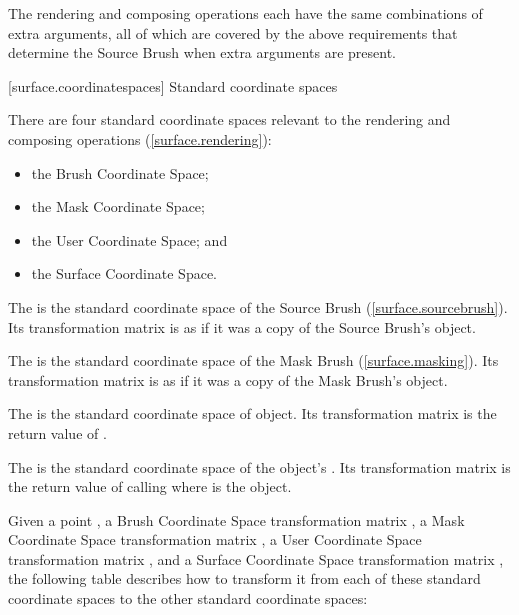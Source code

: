 \pnum
\enternote
The rendering and composing operations each have the same combinations of extra arguments, all of which are covered by the above requirements that determine the Source Brush when extra arguments are present.
\exitnote

%
 [surface.coordinatespaces] {Standard coordinate spaces}

\pnum
There are four standard coordinate spaces relevant to the rendering and composing operations (\ref{surface.rendering}):
\begin{itemize}
\item the Brush Coordinate Space;
\item the Mask Coordinate Space;
\item the User Coordinate Space; and
\item the Surface Coordinate Space.
\end{itemize}

\pnum
The  is the standard coordinate space of the Source Brush (\ref{surface.sourcebrush}). Its transformation matrix is as if it was a copy of the Source Brush's  object.

\pnum
The  is the standard coordinate space of the Mask Brush (\ref{surface.masking}). Its transformation matrix is as if it was a copy of the Mask Brush's  object.

\pnum
The  is the standard coordinate space of  object. Its transformation matrix is the return value of .

\pnum
The  is the standard coordinate space of the  object's \underlyingsurface. Its transformation matrix is the return value of calling  where  is the  object.

\pnum
Given a point , a Brush Coordinate Space transformation matrix , a Mask Coordinate Space transformation matrix , a User Coordinate Space transformation matrix , and a Surface Coordinate Space transformation matrix , the following table describes how to transform it from each of these standard coordinate spaces to the other standard coordinate spaces:

